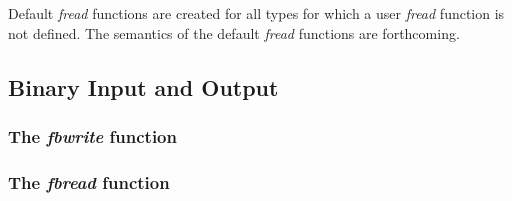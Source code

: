 Default {\em fread} functions are created for all types for which a
user {\em fread} function is not defined.  The semantics of the
default {\em fread} functions are forthcoming.

\subsection{Binary Input and Output}

\subsubsection{The {\em fbwrite} function}

\subsubsection{The {\em fbread} function}

